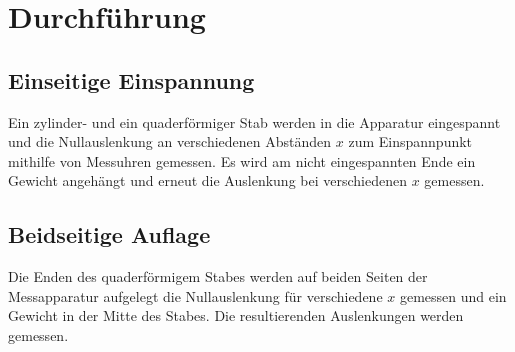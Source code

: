 \section{Durchführung}
\label{sec:Durchführung}

\subsection{Einseitige Einspannung}

Ein zylinder- und ein quaderförmiger Stab werden in die Apparatur eingespannt und die Nullauslenkung an verschiedenen Abständen $x$ zum Einspannpunkt mithilfe von Messuhren gemessen. Es wird am nicht eingespannten Ende ein Gewicht angehängt und erneut die Auslenkung bei verschiedenen $x$ gemessen.


\subsection{Beidseitige Auflage}

Die Enden des quaderförmigem Stabes werden auf beiden Seiten der Messapparatur aufgelegt die Nullauslenkung für verschiedene $x$ gemessen und ein Gewicht in der Mitte des Stabes.
Die resultierenden Auslenkungen werden gemessen.